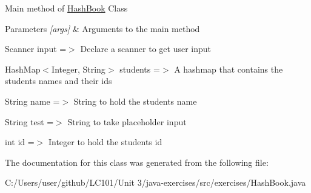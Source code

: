 Main method of \mbox{\hyperlink{classexercises_1_1_hash_book}{Hash\+Book}} Class 
\begin{DoxyParams}{Parameters}
{\em \mbox{[}args\mbox{]}} & Arguments to the main method \\
\hline
\end{DoxyParams}
Scanner input =$>$ Declare a scanner to get user input

Hash\+Map$<$\+Integer, String$>$ students =$>$ A hashmap that contains the student\textquotesingle{}s names and their ids

String name =$>$ String to hold the student\textquotesingle{}s name

String test =$>$ String to take placeholder input

int id =$>$ Integer to hold the student\textquotesingle{}s id 

The documentation for this class was generated from the following file\+:\begin{DoxyCompactItemize}
\item 
C\+:/\+Users/user/github/\+L\+C101/\+Unit 3/java-\/exercises/src/exercises/Hash\+Book.\+java\end{DoxyCompactItemize}

